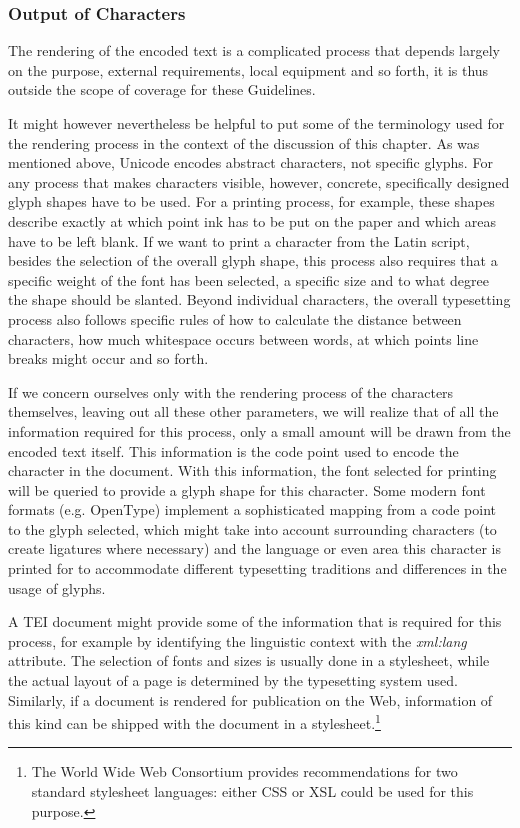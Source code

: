 \subsubsection[{Output of Characters}]{Output of Characters}\label{D4-45a}\par
The rendering of the encoded text is a complicated process that depends largely on the purpose, external requirements, local equipment and so forth, it is thus outside the scope of coverage for these Guidelines. \par
It might however nevertheless be helpful to put some of the terminology used for the rendering process in the context of the discussion of this chapter. As was mentioned above, Unicode encodes abstract characters, not specific glyphs. For any process that makes characters visible, however, concrete, specifically designed glyph shapes have to be used. For a printing process, for example, these shapes describe exactly at which point ink has to be put on the paper and which areas have to be left blank. If we want to print a character from the Latin script, besides the selection of the overall glyph shape, this process also requires that a specific weight of the font has been selected, a specific size and to what degree the shape should be slanted. Beyond individual characters, the overall typesetting process also follows specific rules of how to calculate the distance between characters, how much whitespace occurs between words, at which points line breaks might occur and so forth. \par
If we concern ourselves only with the rendering process of the characters themselves, leaving out all these other parameters, we will realize that of all the information required for this process, only a small amount will be drawn from the encoded text itself. This information is the code point used to encode the character in the document. With this information, the font selected for printing will be queried to provide a glyph shape for this character. Some modern font formats (e.g. OpenType) implement a sophisticated mapping from a code point to the glyph selected, which might take into account surrounding characters (to create ligatures where necessary) and the language or even area this character is printed for to accommodate different typesetting traditions and differences in the usage of glyphs. \par
A TEI document might provide some of the information that is required for this process, for example by identifying the linguistic context with the {\itshape xml:lang} attribute. The selection of fonts and sizes is usually done in a stylesheet, while the actual layout of a page is determined by the typesetting system used. Similarly, if a document is rendered for publication on the Web, information of this kind can be shipped with the document in a stylesheet.\footnote{The World Wide Web Consortium provides recommendations for two standard stylesheet languages: either CSS or XSL could be used for this purpose.}
